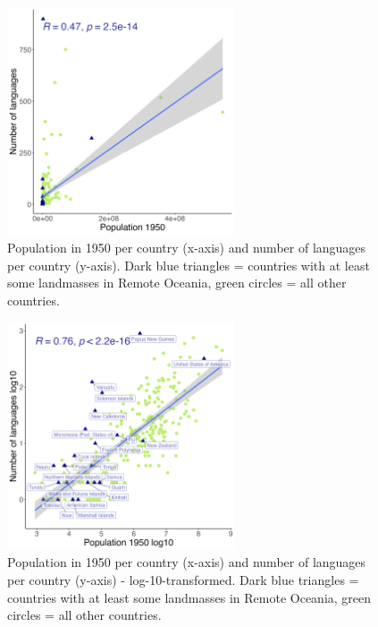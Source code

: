 \documentclass[unnumsec,webpdf,modern,medium]{oup-authoring-template}
\begin{document}
\begin{figure}[ht]
    \centering
    \includegraphics[width=0.6\textwidth]{number_of_languages_vs_pop_1950.png}
    \caption{Population in 1950 per country (x-axis) and number of languages per country (y-axis). Dark blue triangles = countries with at least some landmasses in Remote Oceania, green circles = all other countries.}
        \label{appendix_fig:un_pop_plot}
    \end{figure}
    
\begin{figure}[ht]
    \centering
          \includegraphics[width=0.6\textwidth]{number_of_languages_vs_pop_1950_log10.png}
    \caption{Population in 1950 per country (x-axis) and number of languages per country (y-axis) - log-10-transformed. Dark blue triangles = countries with at least some landmasses in Remote Oceania, green circles = all other countries.}
    \label{appendix_fig:un_pop_plot_log10}
    \end{figure}
\end{document}
